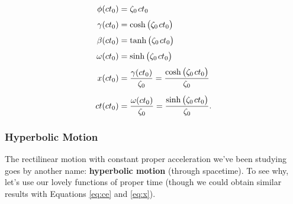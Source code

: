 \documentclass[12pt]{article}
\begin{document}
\begin{equation*}
\begin{aligned}
\phi (ct_0) &= \zeta_0 \mkern2mu ct_0 \\[3pt]
\gamma (ct_0) &= \cosh \big( \zeta_0 \mkern2mu ct_0 \big) \\[3pt]
\beta (ct_0) &= \tanh \big( \zeta_0 \mkern2mu ct_0 \big) \\[3pt]
\omega (ct_0) &= \sinh \big( \zeta_0 \mkern2mu ct_0 \big) \\[3pt]
x(ct_0) &= \dfrac{\gamma(ct_0)}{ \zeta_0 } = \dfrac{\cosh \big( \zeta_0 \mkern2mu ct_0 \big)}{ \zeta_0 } \\[5pt]
ct(ct_0) &= \dfrac{\omega (ct_0) }{ \zeta_0} = \dfrac{\sinh \big( \zeta_0 \mkern2mu ct_0 \big)}{ \zeta_0 }.
\end{aligned}
\end{equation*}



\subsubsection{Hyperbolic Motion}

The rectilinear motion with constant proper acceleration we've been studying goes by another name: \textbf{hyperbolic motion} (through spacetime). To see why, let's use our lovely functions of proper time (though we could obtain similar results with Equations \ref{eq:ce} and \ref{eq:x}).
\end{document}
